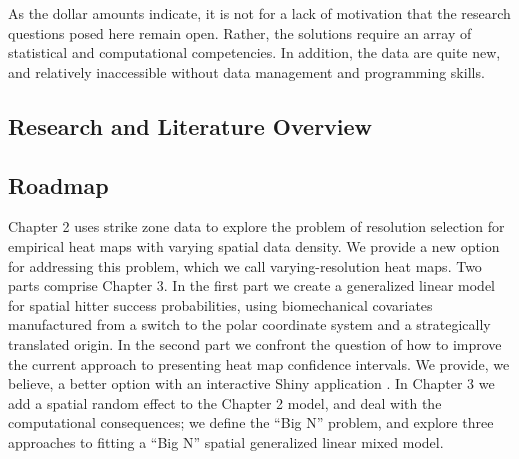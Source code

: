 As the dollar amounts indicate, it is not for a lack of motivation that the research questions posed here remain open. Rather, the solutions require an array of statistical and computational competencies. In addition, the data are quite new, and relatively inaccessible without data management and programming skills.


\subsection{Research and Literature Overview}

\subsection{Roadmap}


Chapter 2 uses strike zone data to explore the problem of resolution selection for empirical heat maps with varying spatial data density. We provide a new option for addressing this problem, which we call varying-resolution heat maps. Two parts comprise Chapter 3. In the first part we create a generalized linear model for spatial hitter success probabilities, using biomechanical covariates manufactured from a switch to the polar coordinate system and a strategically translated origin. In the second part we confront the question of how to improve the current approach to presenting heat map confidence intervals. We provide, we believe, a better option with an interactive Shiny application \citep{Shiny}. In Chapter 3 we add a spatial random effect to the Chapter 2 model, and deal with the computational consequences; we define the ``Big N'' problem, and explore three approaches to fitting a ``Big N'' spatial generalized linear mixed model. 

% 
% 
% 
% 